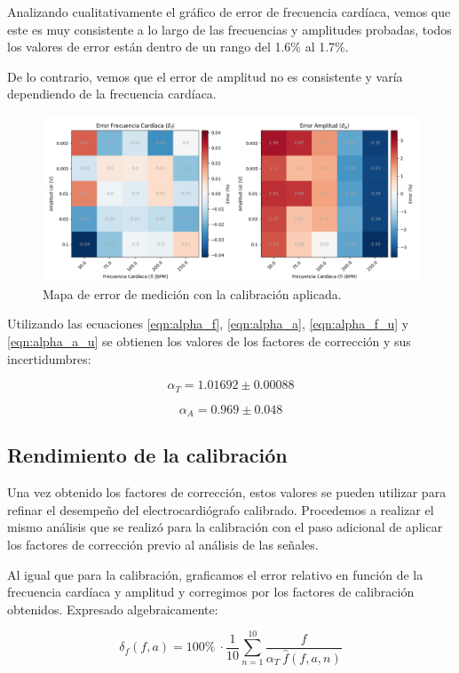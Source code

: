 \documentclass[conference]{IEEEtran}
\begin{document}
Analizando cualitativamente el gráfico de error de frecuencia cardíaca, vemos que este
es muy consistente a lo largo de las frecuencias y amplitudes probadas,
todos los valores de error están dentro de un rango del 1.6\% al 1.7\%.

De lo contrario, vemos que el error de amplitud no es consistente y varía
dependiendo de la frecuencia cardíaca.
\begin{figure}[t]
    \centering
    \includegraphics[width=\textwidth]{figs/test_error_map.png}
    \caption{Mapa de error de medición con la calibración aplicada.}
    \label{fig:plot_errpr_con_calib}

\end{figure}
Utilizando las ecuaciones \ref{eqn:alpha_f}, \ref{eqn:alpha_a}, \ref{eqn:alpha_f_u}
y \ref{eqn:alpha_a_u} se obtienen los valores de los factores de corrección y sus
incertidumbres:

\boldmath
$$ \alpha_{T} = 1.01692 \pm 0.00088 $$

$$ \alpha_{A} = 0.969 \pm 0.048 $$
\unboldmath 



\subsection{Rendimiento de la calibración}


Una vez obtenido los factores de corrección, estos valores se pueden utilizar
para refinar el desempeño del electrocardiógrafo calibrado. Procedemos a realizar
el mismo análisis que se realizó para la calibración con el paso adicional de
aplicar los factores de corrección previo al análisis de las señales.

Al igual que para la calibración, graficamos el error relativo en función de 
la frecuencia cardíaca y amplitud y corregimos por los factores de calibración
obtenidos. Expresado algebraicamente:

$$ \delta_{f} \left(f, a\right) = 100 \% ~ \cdot \dfrac{1}{10} \sum_{n=1}^{10}
\dfrac{f}{\alpha_T ~ \hat{f}(f,a,n)}$$
 
\end{document}
